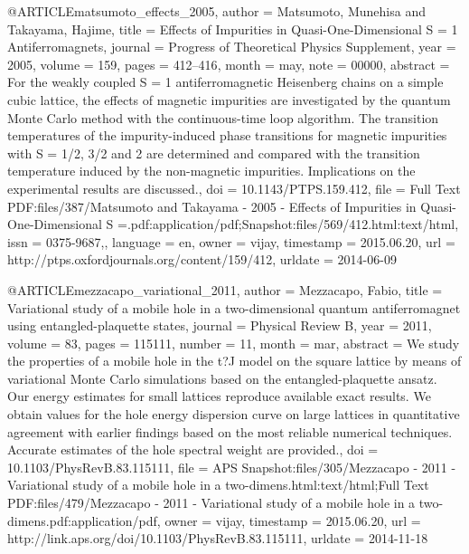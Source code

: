 @ARTICLE{matsumoto_effects_2005,
  author = {Matsumoto, Munehisa and Takayama, Hajime},
  title = {Effects of {Impurities} in {Quasi}-{One}-{Dimensional} {S} = 1 {Antiferromagnets}},
  journal = {Progress of Theoretical Physics Supplement},
  year = {2005},
  volume = {159},
  pages = {412--416},
  month = may,
  note = {00000},
  abstract = {For the weakly coupled S = 1 antiferromagnetic Heisenberg chains on
	a simple cubic lattice, the effects of magnetic impurities are investigated
	by the quantum Monte Carlo method with the continuous-time loop algorithm.
	The transition temperatures of the impurity-induced phase transitions
	for magnetic impurities with S = 1/2, 3/2 and 2 are determined and
	compared with the transition temperature induced by the non-magnetic
	impurities. Implications on the experimental results are discussed.},
  doi = {10.1143/PTPS.159.412},
  file = {Full Text PDF:files/387/Matsumoto and Takayama - 2005 - Effects of Impurities in Quasi-One-Dimensional S =.pdf:application/pdf;Snapshot:files/569/412.html:text/html},
  issn = {0375-9687,},
  language = {en},
  owner = {vijay},
  timestamp = {2015.06.20},
  url = {http://ptps.oxfordjournals.org/content/159/412},
  urldate = {2014-06-09}
}

@ARTICLE{mezzacapo_variational_2011,
  author = {Mezzacapo, Fabio},
  title = {Variational study of a mobile hole in a two-dimensional quantum antiferromagnet
	using entangled-plaquette states},
  journal = {Physical Review B},
  year = {2011},
  volume = {83},
  pages = {115111},
  number = {11},
  month = mar,
  abstract = {We study the properties of a mobile hole in the t?J model on the square
	lattice by means of variational Monte Carlo simulations based on
	the entangled-plaquette ansatz. Our energy estimates for small lattices
	reproduce available exact results. We obtain values for the hole
	energy dispersion curve on large lattices in quantitative agreement
	with earlier findings based on the most reliable numerical techniques.
	Accurate estimates of the hole spectral weight are provided.},
  doi = {10.1103/PhysRevB.83.115111},
  file = {APS Snapshot:files/305/Mezzacapo - 2011 - Variational study of a mobile hole in a two-dimens.html:text/html;Full Text PDF:files/479/Mezzacapo - 2011 - Variational study of a mobile hole in a two-dimens.pdf:application/pdf},
  owner = {vijay},
  timestamp = {2015.06.20},
  url = {http://link.aps.org/doi/10.1103/PhysRevB.83.115111},
  urldate = {2014-11-18}
}

